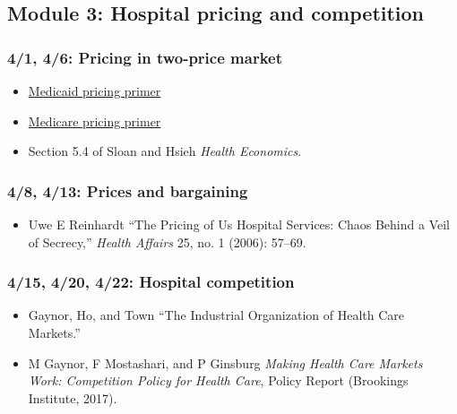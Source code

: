 \documentclass[11pt,]{article}
\providecommand{\tightlist}{%
  \setlength{\itemsep}{0pt}\setlength{\parskip}{0pt}}
\begin{document}
\hypertarget{module-3-hospital-pricing-and-competition}{%
\subsection{Module 3: Hospital pricing and
competition}\label{module-3-hospital-pricing-and-competition}}

\hypertarget{pricing-in-two-price-market}{%
\subsubsection{4/1, 4/6: Pricing in two-price
market}\label{pricing-in-two-price-market}}

\begin{itemize}
\tightlist
\item
  \href{https://www.macpac.gov/medicaid-101/}{Medicaid pricing primer}
\item
  \href{https://fas.org/sgp/crs/misc/R40425.pdf}{Medicare pricing
  primer}
\item
  Section 5.4 of Sloan and Hsieh \emph{Health Economics}.
\end{itemize}

\hypertarget{prices-and-bargaining}{%
\subsubsection{4/8, 4/13: Prices and
bargaining}\label{prices-and-bargaining}}

\begin{itemize}
\tightlist
\item
  Uwe E Reinhardt ``The Pricing of Us Hospital Services: Chaos Behind a
  Veil of Secrecy,'' \emph{Health Affairs} 25, no. 1 (2006): 57--69.
\end{itemize}

\hypertarget{hospital-competition}{%
\subsubsection{4/15, 4/20, 4/22: Hospital
competition}\label{hospital-competition}}

\begin{itemize}
\tightlist
\item
  Gaynor, Ho, and Town ``The Industrial Organization of Health Care
  Markets.''
\item
  M Gaynor, F Mostashari, and P Ginsburg \emph{Making Health Care
  Markets Work: Competition Policy for Health Care}, Policy Report
  (Brookings Institute, 2017).
\end{itemize}
\end{document}
